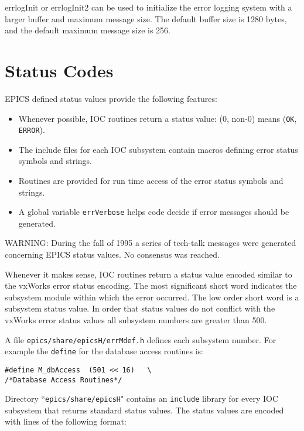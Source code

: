 errlogInit or errlogInit2 can be used to initialize the error logging system with a larger buffer and maximum message size. 
The default buffer size is 1280 bytes, and the default maximum message size is 256.

\section{Status Codes}

EPICS defined status values provide the following features:

\begin{itemize}\item Whenever possible, IOC routines return a status value: (0, non-0) means (\verb|OK|, \verb|ERROR|).

\item The include files for each IOC subsystem contain macros defining error status symbols and strings.

\item Routines are provided for run time access of the error status symbols and strings.

\item A global variable \verb|errVerbose| helps code decide if error messages should be generated.

\end{itemize}WARNING: During the fall of 1995 a series of tech-talk messages were generated concerning EPICS status values. No 
consensus was reached.

Whenever it makes sense, IOC routines return a status value encoded similar to the vxWorks error status encoding. The 
most significant short word indicates the subsystem module within which the error occurred. The low order short word is 
a subsystem status value. In order that status values do not conflict with the vxWorks error status values all subsystem 
numbers are greater than 500. 

A file \verb|epics/share/epicsH/errMdef.h| defines each subsystem number. For example the \verb|define| for the 
database access routines is:

\begin{verbatim}#define M_dbAccess  (501 << 16)   \
/*Database Access Routines*/
\end{verbatim}Directory ``\verb|epics/share/epicsH|" contains an \verb|include| library for every IOC subsystem that returns standard status 
values. The status values are encoded with lines of the following format: 

